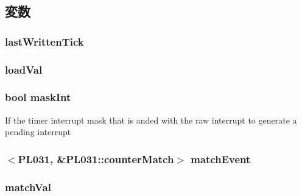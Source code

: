 \subsection{変数}
\hypertarget{classPL031_a5ec5436086013ab89afd5d80ce94d811}{
\subsubsection[{lastWrittenTick}]{ {\bf lastWrittenTick}}}
\label{classPL031_a5ec5436086013ab89afd5d80ce94d811}
\hypertarget{classPL031_a649a97ed02659f08e9b7064c15839dc8}{
\subsubsection[{loadVal}]{ {\bf loadVal}}}
\label{classPL031_a649a97ed02659f08e9b7064c15839dc8}
\hypertarget{classPL031_a9212a63025fe8820d56a0bd3943c158c}{
\subsubsection[{maskInt}]{\setlength{\rightskip}{0pt plus 5cm}bool {\bf maskInt}}}
\label{classPL031_a9212a63025fe8820d56a0bd3943c158c}
If the timer interrupt mask that is anded with the raw interrupt to generate a pending interrupt \hypertarget{classPL031_ac07c37f262f3f70510cc5c198f823d09}{
\subsubsection[{matchEvent}]{$<${\bf PL031}, \&PL031::counterMatch$>$ {\bf matchEvent}}}
\label{classPL031_ac07c37f262f3f70510cc5c198f823d09}
\hypertarget{classPL031_afa49f4e3c316a9e0343eecbcbd92d4dd}{
\subsubsection[{matchVal}]{ {\bf matchVal}}}
